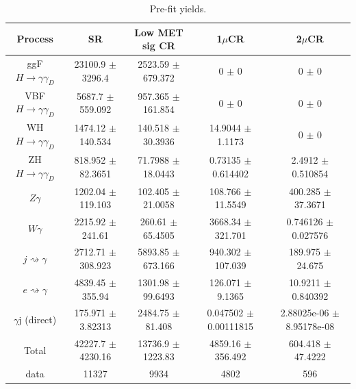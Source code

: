 \begin{table}[htpb!]
\centering
\begin{tabular}{c|cccc}
\hline
\textbf{Process} & \textbf{SR}& \textbf{Low MET sig CR} & \textbf{1$\mu$CR} & \textbf{2$\mu$CR} \\
\hline
  ggF $H\to\gamma\gamma_D$   & 23100.9 $\pm$ 3296.4 & 2523.59 $\pm$ 679.372 & 0 $\pm$ 0 & 0 $\pm$ 0 \\ 
  VBF $H\to\gamma\gamma_D$   & 5687.7 $\pm$ 559.092 & 957.365 $\pm$ 161.854 & 0 $\pm$ 0 & 0 $\pm$ 0 \\ 
  WH $H\to\gamma\gamma_D$    & 1474.12 $\pm$ 140.534 & 140.518 $\pm$ 30.3936 & 14.9044 $\pm$ 1.1173 & 0 $\pm$ 0 \\ 
  ZH $H\to\gamma\gamma_D$    & 818.952 $\pm$ 82.3651 & 71.7988 $\pm$ 18.0443 & 0.73135 $\pm$ 0.614402 & 2.4912 $\pm$ 0.510854 \\ 
  $Z\gamma$   & 1202.04 $\pm$ 119.103 & 102.405 $\pm$ 21.0058 & 108.766 $\pm$ 11.5549 & 400.285 $\pm$ 37.3671 \\ 
  $W\gamma$   & 2215.92 $\pm$ 241.61 & 260.61 $\pm$ 65.4505 & 3668.34 $\pm$ 321.701 & 0.746126 $\pm$ 0.027576 \\ 
  $j\rightsquigarrow\gamma$    & 2712.71 $\pm$ 308.923 & 5893.85 $\pm$ 673.166 & 940.302 $\pm$ 107.039 & 189.975 $\pm$ 24.675 \\ 
  $e\rightsquigarrow\gamma$   & 4839.45 $\pm$ 355.94 & 1301.98 $\pm$ 99.6493 & 126.071 $\pm$ 9.1365 & 10.9211 $\pm$ 0.840392 \\ 
  $\gamma$j (direct)   & 175.971 $\pm$ 3.82313 & 2484.75 $\pm$ 81.408 & 0.047502 $\pm$ 0.00111815 & 2.88025e-06 $\pm$ 8.95178e-08 \\ 
\hline 
  Total  & 42227.7 $\pm$ 4230.16 & 13736.9 $\pm$ 1223.83 & 4859.16 $\pm$ 356.492 & 604.418 $\pm$ 47.4222 \\ 
\hline 
  data   & 11327 & 9934 & 4802 & 596 \\ 
\hline 

\end{tabular}
\caption{Pre-fit yields.}
\label{tab:yields_pre_syst_unblind}
\end{table}

